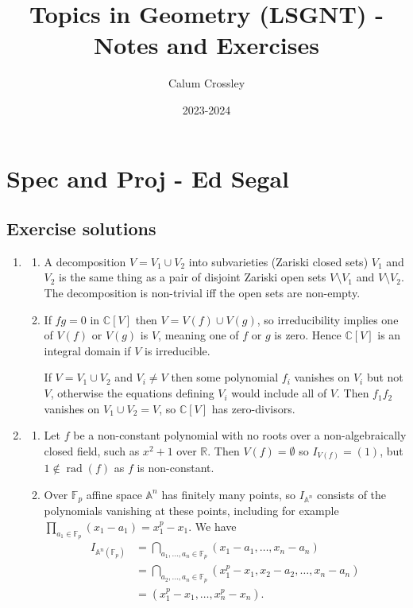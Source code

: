 \documentclass{article}
\title{Topics in Geometry (LSGNT) - Notes and Exercises}
\author{Calum Crossley}
\date{2023-2024}
\theoremstyle{definition}
\DeclareMathOperator{\rad}{rad}
\newcommand{\F}{\mathbb{F}}
\newcommand{\A}{\mathbb{A}}
\newcommand{\R}{\mathbb{R}}
\newcommand{\C}{\mathbb{C}}
\begin{document}
\maketitle

\section{Spec and Proj - Ed Segal}

\subsection*{Exercise solutions}


\begin{enumerate}

\item
\begin{enumerate}[label=(\alph*)]

\item 
A decomposition $V=V_1\cup V_2$ into subvarieties (Zariski
closed sets) $V_1$ and $V_2$ is the same thing as a pair of
disjoint Zariski open sets $V\setminus V_1$ and
$V\setminus V_2$. The decomposition is non-trivial iff the open
sets are non-empty.

\item
If $fg=0$ in $\C[V]$ then $V=V(f)\cup V(g)$, so irreducibility
implies one of $V(f)$ or $V(g)$ is $V$, meaning one of $f$ or
$g$ is zero. Hence $\C[V]$ is an integral domain if $V$ is
irreducible.

If $V=V_1\cup V_2$ and $V_i\ne V$ then some polynomial
$f_i$ vanishes on $V_i$ but not $V$, otherwise the equations
defining $V_i$ would include all of $V$. Then $f_1f_2$ vanishes
on $V_1\cup V_2=V$, so $\C[V]$ has zero-divisors.

\end{enumerate}

\item
\begin{enumerate}[label=(\alph*)]

\item 
Let $f$ be a non-constant polynomial with no roots over a non-algebraically
closed field, such as $x^2+1$ over $\R$. Then $V(f)=\emptyset$ so
$I_{V(f)}=(1)$, but $1\notin\rad(f)$ as $f$ is non-constant.

\item
Over $\F_p$ affine space $\A^n$ has finitely many points, so $I_{\A^n}$ consists
of the polynomials vanishing at these points, including for example
$\prod_{a_1\in\F_p}(x_1-a_1)=x_1^p-x_1$. We have
\begin{align*}
    I_{\A^n(\F_p)}
        &= \bigcap_{a_1,\ldots,a_n\in\F_p}(x_1-a_1,\ldots,x_n-a_n) \\
        &= \bigcap_{a_2,\ldots,a_n\in\F_p}(x_1^p-x_1,x_2-a_2,\ldots,x_n-a_n) \\
        &= (x_1^p-x_1,\ldots,x_n^p-x_n).
\end{align*}


\end{enumerate}
\end{enumerate}
\end{document}
